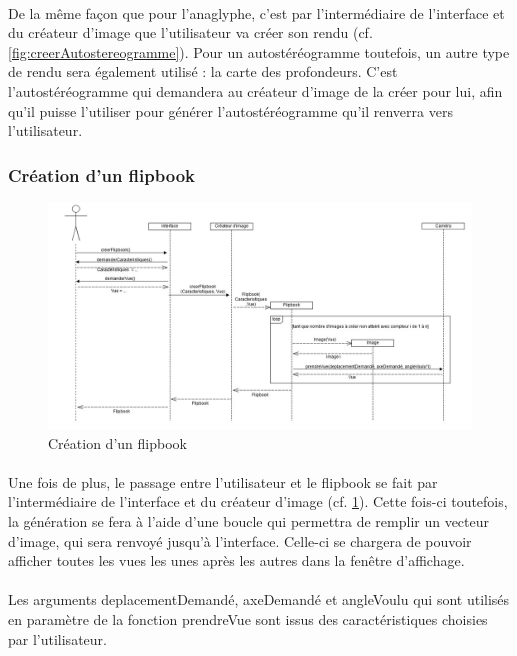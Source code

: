 \paragraph{}
De la même façon que pour l’anaglyphe, c’est par l’intermédiaire de l’interface et du créateur d’image que l’utilisateur va créer son rendu (cf. \ref{fig:creerAutostereogramme}). Pour un autostéréogramme toutefois, un autre type de rendu sera également utilisé : la carte des profondeurs. C’est l’autostéréogramme qui demandera au créateur d’image de la créer pour lui, afin qu’il puisse l’utiliser pour générer l’autostéréogramme qu’il renverra vers l’utilisateur.

\newpage

\subsubsection{Création d'un flipbook}

\begin{figure}[h]
		\centering
		\includegraphics[scale=0.4]{creerflipbook.jpg}
		\caption{\label{fig:creerFlip} Création d'un flipbook}
\end{figure}

\paragraph{}
Une fois de plus, le passage entre l’utilisateur et le flipbook se fait par l’intermédiaire de l’interface et du créateur d’image (cf. \ref{fig:creerFlip}). Cette fois-ci toutefois, la génération se fera à l’aide d’une boucle qui permettra de remplir un vecteur d’image, qui sera renvoyé jusqu’à l’interface. Celle-ci se chargera de pouvoir afficher toutes les vues les unes après les autres dans la fenêtre d’affichage.

\paragraph{}
Les arguments deplacementDemandé, axeDemandé et angleVoulu qui sont utilisés en paramètre de la fonction prendreVue sont issus des caractéristiques choisies par l'utilisateur.

